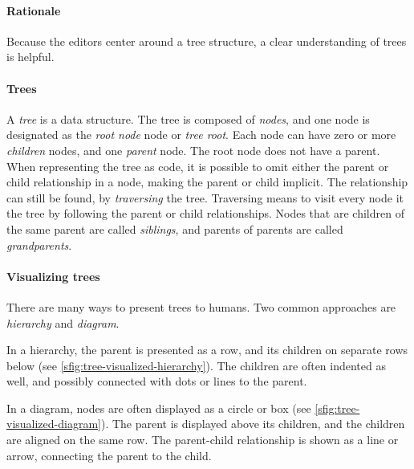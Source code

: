 \paragraph{Rationale}
Because the editors center around a tree structure, a clear understanding of trees is helpful.

\paragraph{Trees}
A \textit{tree} is a data structure.
The tree is composed of \textit{nodes}, and one node is designated as the \textit{root node} node or \textit{tree root}.
Each node can have zero or more \textit{children} nodes, and one \textit{parent} node.
The root node does not have a parent.
When representing the tree as code, it is possible to omit either the parent or child relationship in a node, making the parent or child implicit.
The relationship can still be found, by \textit{traversing} the tree.
Traversing means to visit every node it the tree by following the parent or child relationships.
Nodes that are children of the same parent are called \textit{siblings}, and parents of parents are called \textit{grandparents}.

\paragraph{Visualizing trees}
There are many ways to present trees to humans.
Two common approaches are \textit{hierarchy} and \textit{diagram}.


In a hierarchy, the parent is presented as a row, and its children on separate rows below (see \cref{sfig:tree-visualized-hierarchy}).
The children are often indented as well, and possibly connected with dots or lines to the parent.


In a diagram, nodes are often displayed as a circle or box (see \cref{sfig:tree-visualized-diagram}).
The parent is displayed above its children, and the children are aligned on the same row.
The parent-child relationship is shown as a line or arrow, connecting the parent to the child.


